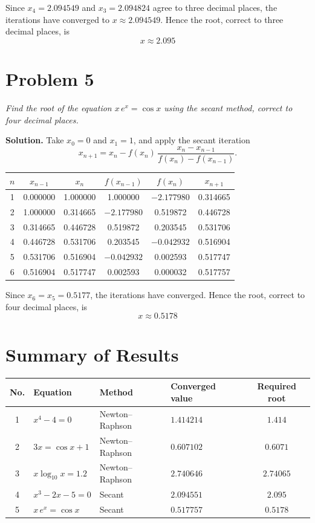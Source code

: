 \documentclass[11pt,a4paper]{article}
\begin{document}
Since $x_{4}=2.094549$ and $x_{3}=2.094824$ agree to three decimal places, the
iterations have converged to $x\approx2.094549$. Hence the root, correct to three
decimal places, is
\[
\boxed{x \approx 2.095}
\]

\section*{Problem 5}
\textit{Find the root of the equation $x\,e^{x}=\cos x$ using the secant method,
correct to four decimal places.}

\textbf{Solution.}  Take $x_{0}=0$ and $x_{1}=1$, and apply the secant iteration
\[
x_{n+1}=x_{n}-f(x_{n})\,\frac{x_{n}-x_{n-1}}{f(x_{n})-f(x_{n-1})}.
\]

\begin{center}
\begin{tabular}{cccccc}
\toprule
$n$ & $x_{n-1}$ & $x_{n}$ & $f(x_{n-1})$ & $f(x_{n})$ & $x_{n+1}$ \\
\midrule
1 & 0.000000 & 1.000000 & 1.000000 & $-2.177980$ & 0.314665 \\
2 & 1.000000 & 0.314665 & $-2.177980$ & 0.519872 & 0.446728 \\
3 & 0.314665 & 0.446728 & 0.519872 & 0.203545 & 0.531706 \\
4 & 0.446728 & 0.531706 & 0.203545 & $-0.042932$ & 0.516904 \\
5 & 0.531706 & 0.516904 & $-0.042932$ & 0.002593 & 0.517747 \\
6 & 0.516904 & 0.517747 & 0.002593 & 0.000032 & 0.517757 \\
\bottomrule
\end{tabular}
\end{center}

Since $x_{6}=x_{5}=0.5177$, the iterations have converged. Hence the root, correct
to four decimal places, is
\[
\boxed{x \approx 0.5178}
\]

\section*{Summary of Results}

\begin{center}
\begin{tabular}{clllc}
\toprule
No. & Equation & Method & Converged value & Required root \\
\midrule
1 & $x^{4}-4=0$          & Newton--Raphson & $1.414214$ & $1.414$   \\
2 & $3x=\cos x+1$        & Newton--Raphson & $0.607102$ & $0.6071$  \\
3 & $x\log_{10}x=1.2$    & Newton--Raphson & $2.740646$ & $2.74065$ \\
4 & $x^{3}-2x-5=0$       & Secant          & $2.094551$ & $2.095$   \\
5 & $x\,e^{x}=\cos x$    & Secant          & $0.517757$ & $0.5178$  \\
\bottomrule
\end{tabular}
\end{center}
\end{document}
